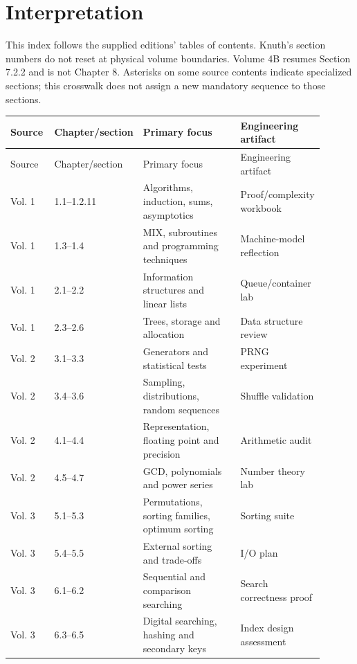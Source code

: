 \documentclass[11pt,letterpaper]{article}
\begin{document}
\tableofcontents
\clearpage
{}
\section{Interpretation}
This index follows the supplied editions' tables of contents. Knuth's section numbers do not reset at physical volume boundaries. Volume 4B resumes Section 7.2.2 and is not Chapter 8. Asterisks on some source contents indicate specialized sections; this crosswalk does not assign a new mandatory sequence to those sections.
\small
\begin{longtable}{@{}p{0.14\linewidth}p{0.22\linewidth}>{\raggedright\arraybackslash}p{0.31\linewidth}>{\raggedright\arraybackslash}p{0.23\linewidth}@{}}
\toprule Source & Chapter/section & Primary focus & Engineering artifact\\\midrule\endfirsthead
\toprule Source & Chapter/section & Primary focus & Engineering artifact\\\midrule\endhead
Vol. 1 & 1.1--1.2.11 & Algorithms, induction, sums, asymptotics & Proof/complexity workbook\\
Vol. 1 & 1.3--1.4 & MIX, subroutines and programming techniques & Machine-model reflection\\
Vol. 1 & 2.1--2.2 & Information structures and linear lists & Queue/container lab\\
Vol. 1 & 2.3--2.6 & Trees, storage and allocation & Data structure review\\
Vol. 2 & 3.1--3.3 & Generators and statistical tests & PRNG experiment\\
Vol. 2 & 3.4--3.6 & Sampling, distributions, random sequences & Shuffle validation\\
Vol. 2 & 4.1--4.4 & Representation, floating point and precision & Arithmetic audit\\
Vol. 2 & 4.5--4.7 & GCD, polynomials and power series & Number theory lab\\
Vol. 3 & 5.1--5.3 & Permutations, sorting families, optimum sorting & Sorting suite\\
Vol. 3 & 5.4--5.5 & External sorting and trade-offs & I/O plan\\
Vol. 3 & 6.1--6.2 & Sequential and comparison searching & Search correctness proof\\
Vol. 3 & 6.3--6.5 & Digital searching, hashing and secondary keys & Index design assessment\\

\end{longtable}
\end{document}
